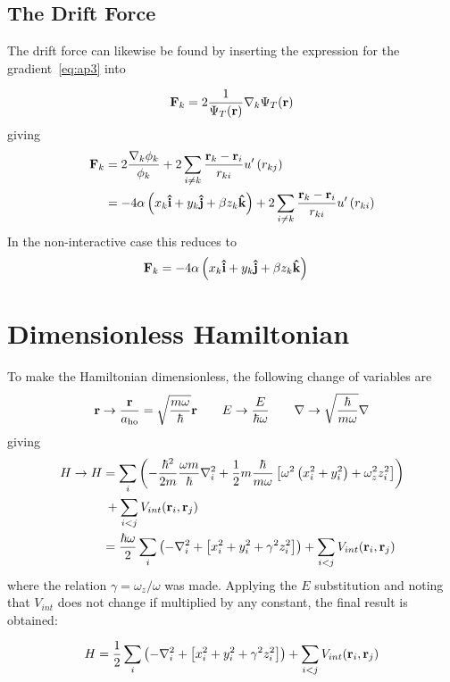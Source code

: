 \subsection{The Drift Force}
\label{app:drift}
The drift force can likewise be found by inserting the expression for the
gradient~\eqref{eq:ap3} into

\begin{align*}
  \vb{F}_{k} = 2\frac{1}{\Psi_T(\vb{r})}\nabla_{k}\Psi_T(\vb{r})
\end{align*}
giving
\begin{align*}
  \vb{F}_{k} &= 2 \frac{\nabla_{k}\phi_{k}}{\phi_{k}} + 2\sum_{i\neq k}\frac{\vb{r}_{k}-\vb{r}_{i}}{r_{ki}}u^{\prime}\left( r_{kj} \right)\\
             &= -4\alpha\left(   x_{k}\uvec{i} + y_{k}\uvec{j} + \beta z_{k}\uvec{k}   \right) + 2\sum_{i\neq k} \frac{\vb{r}_{k}-\vb{r}_{i}}{r_{ki}}u^{\prime}\left( r_{ki} \right)\\
\end{align*}
In the non-interactive case this reduces to
\begin{align*}
  \vb{F}_{k} &= -4\alpha\left(   x_{k}\uvec{i} + y_{k}\uvec{j} + \beta z_{k}\uvec{k}   \right)
\end{align*}



\section{Dimensionless Hamiltonian}\label{appendix:dimhamiltonian}
To make the Hamiltonian dimensionless, the following change of variables are
\begin{align*}
  \vb{r} \to \frac{\vb{r}}{a_{\text{ho}}} = \sqrt{\frac{m\omega}{\hbar}}\vb{r} \qquad E \to \frac{E}{\hbar\omega}
  \qquad \nabla \to \sqrt{\frac{\hbar}{m\omega}}\nabla
\end{align*}
giving
\begin{align*}
  H \to H &= \sum_{i}\left( -\frac{\hbar^{2}}{2m}\frac{\omega m}{\hbar}\nabla^{2}_{i}
  + \frac{1}{2}m\frac{\hbar}{m\omega}\left[ \omega^{2}\left( x_{i}^{2} + y_{i}^{2}\right) + \omega_{z}^{2}z_{i}^{2} \right] \right)\\
  &\: + \sum_{i<j} V_{int}(\vb{r}_{i}, \vb{r}_{j})\\
  &= \frac{\hbar\omega}{2}\sum_{i}\left(  -\nabla_{i}^{2} + \left[ x_{i}^{2} + y_{i}^{2} + \gamma^{2} z_{i}^{2} \right]\right)
    + \sum_{i<j} V_{int}(\vb{r}_{i}, \vb{r}_{j})\\
\end{align*}
where the relation \(\gamma = \omega_{z}/\omega\) was made. Applying the \(E\)
substitution and noting that \(V_{int}\) does not change if multiplied by any constant, the final result is obtained: 

\begin{align*}
  H &= \frac{1}{2}\sum_{i}\left(  -\nabla_{i}^{2} + \left[ x_{i}^{2} + y_{i}^{2} + \gamma^{2} z_{i}^{2} \right]\right)
    + \sum_{i<j} V_{int}(\vb{r}_{i}, \vb{r}_{j})\\
\end{align*}